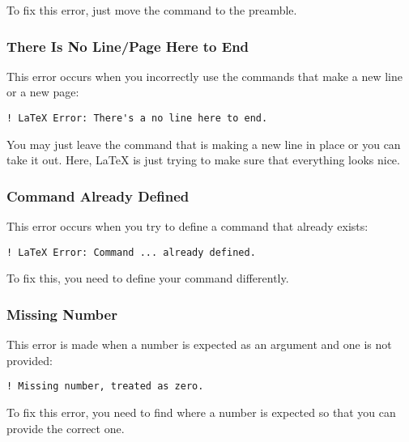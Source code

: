 To fix this error, just move the command to the preamble.

\subsubsection{There Is No Line/Page Here to End}
\label{sec:there-no-linepage}

This error occurs when you incorrectly use the commands that make a
new line or a new page:
\begin{verbatim}
! LaTeX Error: There's a no line here to end.
\end{verbatim}

You may just leave the command that is making a new line in place or
you can take it out.  Here, \LaTeX{} is just trying to make sure that
everything looks nice.

\subsubsection{Command Already Defined}
\label{sec:comm-alre-defin}

This error occurs when you try to define a command that already exists:
\begin{verbatim}
! LaTeX Error: Command ... already defined.
\end{verbatim}

To fix this, you need to define your command differently.

\subsubsection{Missing Number}
\label{sec:missing-number}

This error is made when a number is expected as an argument and one is
not provided:
\begin{verbatim}
! Missing number, treated as zero.
\end{verbatim}

To fix this error, you need to find where a number is expected so that
you can provide the correct one.



